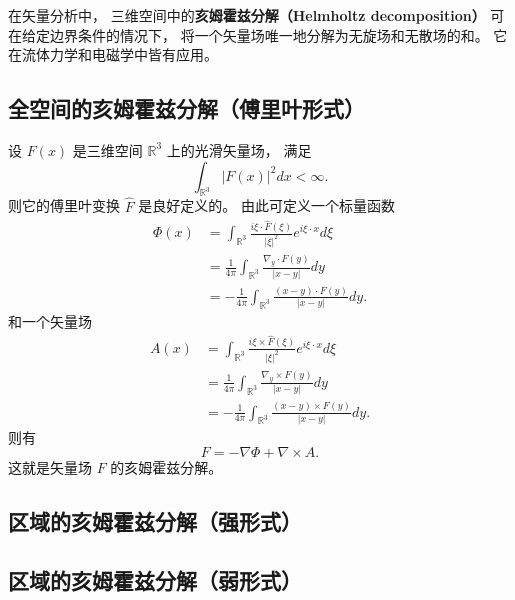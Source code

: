 
\begin{issues}
\issueDraft
\end{issues}


在矢量分析中， 三维空间中的\textbf{亥姆霍兹分解（Helmholtz decomposition）} 可在给定边界条件的情况下， 将一个矢量场唯一地分解为无旋场和无散场的和。 它在流体力学和电磁学中皆有应用。

\subsection{全空间的亥姆霍兹分解（傅里叶形式）}
设 $F(x)$ 是三维空间 $\mathbb{R}^3$ 上的光滑矢量场， 满足
$$
\int_{\mathbb{R}^3}|F(x)|^2dx<\infty.
$$
则它的傅里叶变换 $\hat F$ 是良好定义的。 由此可定义一个标量函数
$$
\begin{aligned}
\Phi(x)
&=\int_{\mathbb{R}^3}\frac{i\xi\cdot\hat F(\xi)}{|\xi|^2}e^{i\xi\cdot x}d\xi\\
&=\frac{1}{4\pi}\int_{\mathbb{R}^3}\frac{\nabla_y\cdot F(y)}{|x-y|}dy\\
&=-\frac{1}{4\pi}\int_{\mathbb{R}^3}\frac{(x-y)\cdot F(y)}{|x-y|}dy.
\end{aligned}
$$
和一个矢量场
$$
\begin{aligned}
A(x)
&=\int_{\mathbb{R}^3}\frac{i\xi\times\hat F(\xi)}{|\xi|^2}e^{i\xi\cdot x}d\xi\\
&=\frac{1}{4\pi}\int_{\mathbb{R}^3}\frac{\nabla_y\times F(y)}{|x-y|}dy\\
&=-\frac{1}{4\pi}\int_{\mathbb{R}^3}\frac{(x-y)\times F(y)}{|x-y|}dy.
\end{aligned}
$$
则有
$$
F=-\nabla\Phi+\nabla\times A.
$$
这就是矢量场 $F$ 的亥姆霍兹分解。

\subsection{区域的亥姆霍兹分解（强形式）}

\subsection{区域的亥姆霍兹分解（弱形式）}
